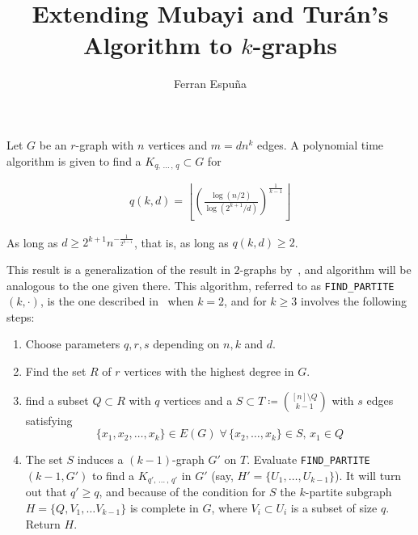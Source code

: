 \documentclass[12pt]{article}
\author{Ferran Espuña}
\date{} %
\begin{document}
    \title{Extending Mubayi and Turán's Algorithm to $k$-graphs}

    \maketitle

    Let $G$ be an $r$-graph with $n$ vertices and $m = dn^k$ edges.
    A polynomial time algorithm is given to find a $K_{q,\, \ldots\, ,\, q} \subset G$ for

    \begin{align*}
        q (k, d) = \left\lfloor \left(  \frac{\log (n/2)}{\log (2^{k+1}/d)} \right)^{\frac{1}{k-1}} \right\rfloor
        \label{eq:q}
    \end{align*}

    As long as $d \geq 2^{k+1} n^{-\frac{1}{2^{k-1}}}$, that is, as long as $q(k, d) \geq 2$.

    This result is a generalization of the result in $2$-graphs by~\cite{MUBAYI2010174},
    and algorithm will be analogous to the one given there.
    This algorithm, referred to as \verb|FIND_PARTITE|$(k, \cdot)$,
    is the one described in~\cite{MUBAYI2010174}
    when $k=2$, and for $k \geq 3$ involves the following steps:

    \begin{enumerate}
        \item Choose parameters $q, r, s$ depending on $n, k$ and $d$. \label{step:choose_parameters}

        \item Find the set $R$ of $r$ vertices with the highest degree in $G$. \label{step:find_R}

        \item find a subset $Q \subset R$ with $q$ vertices and a
        $S \subset T \coloneqq \binom{[n] \setminus Q}{k-1}$ with $s$ edges satisfying
        \[\{x_1, x_2, \ldots, x_k\} \in E(G) \; \forall \, \{x_2, \ldots, x_k\} \in S, \, x_1 \in Q\] \label{step:find_Q_S}

        \item The set $S$ induces a $(k-1)$-graph $G'$ on $T$.
        Evaluate \verb|FIND_PARTITE|$(k-1, G')$ to find a $K_{q',\, \ldots\, ,\, q'}$ in $G'$
        (say, $H' = \{U_1, \ldots, U_{k-1}\}$). It will turn out that $q' \geq q$,
        and because of the condition for $S$ the $k$-partite subgraph $H = \{Q, V_1, \ldots V_{k-1}\}$
        is complete in $G$, where $V_i \subset U_i$ is a subset of size $q$.
        Return $H$.

    \end{enumerate}
\end{document}
